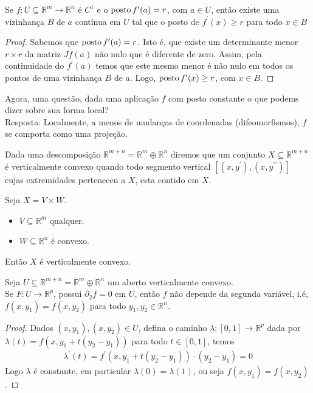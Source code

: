 \begin{proposition}
  Se $f:U\subseteq\mathbb{R}^{m}\to\mathbb{R}^{n}$ é $C^{1}$ e o $\operatorname{posto} f^{\prime}(a)=r$, com $a\in U$, então existe uma vizinhança $B$ de $a$ contínua em $U$ tal que o posto de $f^{\prime}(x)\geq r$ para todo $x\in B$ 
\end{proposition}
\begin{proof} 
  Sabemos que $\operatorname{posto} f^{\prime}(a)=r$. Isto é, que existe um determinante menor $r\times r$ da matriz $Jf(a)$ não nulo que é diferente de zero. Assim, pela continuidade do $f^{\prime}(a)$ temos que este mesmo menor é não nulo em todos os pontos de uma vizinhança $B$ de $a$. Logo, $\operatorname{posto} f^{\prime}(x)\geq r$, com $x\in B$. 
\end{proof}
Agora, uma questão, dada uma aplicação $f$ com posto constante o que podems dizer sobre sua forma local?\\
Resposta: Localmente, a menos de mudanças de coordenadas (difeomorfismos), $f$ se comporta como uma projeção.
\begin{definition}
  Dada uma descomposição $\mathbb{R}^{m+n}=\mathbb{R}^{m}\oplus\mathbb{R}^{n}$ diremos que um conjunto $X\subseteq \mathbb{R}^{m+n}$ é verticalmente convexo quando todo segmento vertical $[(x,y^{\prime}),(x,y^{\prime\prime})]$ cujas extremidades pertenecen a $X$, esta contido em $X$.
  \begin{center}
      
  \end{center}
\end{definition}
\begin{example}
  Seja $X=V\times W$.\\
  \begin{itemize}
    \item $V\subseteq\mathbb{R}^{m}$ qualquer.
    \item $W\subseteq \mathbb{R}^{n}$ é convexo. 
  \end{itemize}
  Então $X$ é verticalmente convexo. 
\end{example}
\begin{lemma}\label{lema:3.11-1teoremadoposto}
  Seja $U\subseteq \mathbb{R}^{m+n}=\mathbb{R}^{m}\oplus\mathbb{R}^{n}$ um aberto verticalmente convexo.\\
  Se $F:U\to\mathbb{R}^{p}$, possui $\partial_{2}f=0$ em $U$, então $f$ não depende da segunda variável, i.é, $f(x,y_1)=f(x,y_2)$ para todo $y_1,y_2\in\mathbb{R}^{n}$. 
\end{lemma}
\begin{proof} 
  Dados $(x,y_1),(x,y_2)\in U$, defina o caminho $\lambda:[0,1]\to\mathbb{R}^{p}$ dada por $\lambda(t)=f(x,y_1+t(y_2-y_1))$ para todo $t\in[0,1]$, temos
  \begin{align*}
    \lambda^{\prime}(t)=f^{\prime}(x,y_1+t(y_2-y_1))\cdot (y_2-y_1)=0
  \end{align*}
  Logo $\lambda$ é constante, em particular $\lambda(0)=\lambda(1)$, ou seja $f(x,y_1)=f(x,y_2)$. 
\end{proof}
